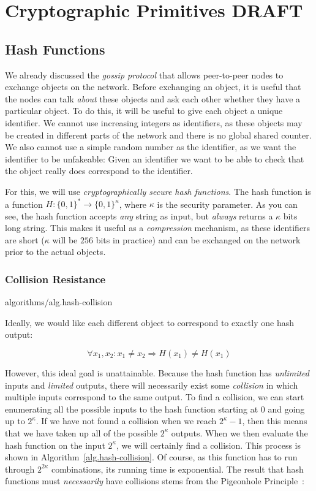 \chapter{Cryptographic Primitives \small{\textsf{DRAFT}}}

\section{Hash Functions}

We already discussed the \emph{gossip protocol} that allows peer-to-peer nodes to exchange
objects on the network. Before exchanging an object, it is useful that the nodes can talk
\emph{about} these objects and ask each other whether they have a particular object. To
do this, it will be useful to give each object a unique identifier. We cannot use
increasing integers as identifiers, as these objects may be created in different parts of
the network and there is no global shared counter. We also cannot use a simple random
number as the identifier, as we want the identifier to be unfakeable: Given an identifier
we want to be able to check that the object really does correspond to the identifier.

For this, we will use \emph{cryptographically secure hash functions}. The hash function
is a function $H: \{0, 1\}^* \longrightarrow \{0, 1\}^\kappa$, where $\kappa$ is the
security parameter. As you can see, the hash function accepts \emph{any} string as input,
but \emph{always} returns a $\kappa$ bits long string. This makes it useful as a
\emph{compression} mechanism, as these identifiers are short ($\kappa$ will be $256$
bits in practice) and can be exchanged on the network prior to the actual objects.

\subsection*{Collision Resistance}

{algorithms/alg.hash-collision}

Ideally, we would like each different object to correspond to exactly one hash
output:

\[
  \forall x_1, x_2: x_1 \neq x_2 \Rightarrow H(x_1) \neq H(x_1)
\]

However, this ideal goal is unattainable.
Because the hash function has \emph{unlimited} inputs and \emph{limited} outputs,
there will necessarily exist some \emph{collision} in which multiple inputs correspond
to the same output. To find a collision, we can start enumerating all the possible
inputs to the hash function starting at $0$ and going up to $2^\kappa$. If we have
not found a collision when we reach $2^\kappa - 1$, then this means that we have taken
up all of the possible $2^\kappa$ outputs. When we then evaluate the hash function on
the input $2^\kappa$, we will certainly find a collision. This process is shown in
Algorithm~\ref{alg.hash-collision}. Of course, as this function has to run through
$2^{2\kappa}$ combinations, its running time is exponential. The result that hash
functions must \emph{necessarily} have collisions stems from the Pigeonhole
Principle~\cite{liu}:

